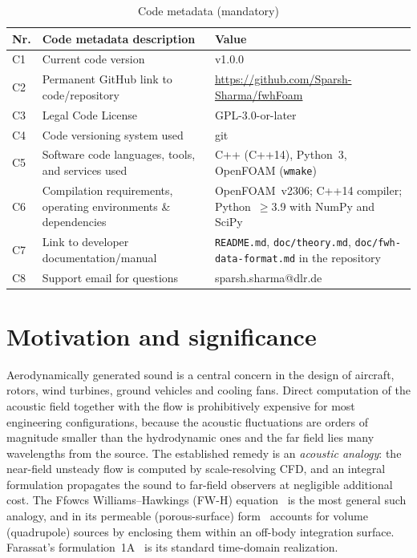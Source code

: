\documentclass[preprint,12pt,a4paper]{elsarticle}
\begin{document}
\begin{table}[!h]
\begin{tabular}{|l|p{5.4cm}|p{6.2cm}|}
\hline
\textbf{Nr.} & \textbf{Code metadata description} & \textbf{Value} \\
\hline
C1 & Current code version & v1.0.0 \\
\hline
C2 & Permanent GitHub link to code/repository & \url{https://github.com/Sparsh-Sharma/fwhFoam} \\
\hline
C3 & Legal Code License & GPL-3.0-or-later \\
\hline
C4 & Code versioning system used & git \\
\hline
C5 & Software code languages, tools, and services used & C++ (C++14), Python~3, OpenFOAM (\texttt{wmake}) \\
\hline
C6 & Compilation requirements, operating environments \& dependencies & OpenFOAM~v2306; C++14 compiler; Python~$\ge$3.9 with NumPy and SciPy \\
\hline
C7 & Link to developer documentation/manual & \texttt{README.md}, \texttt{doc/theory.md}, \texttt{doc/fwh-data-format.md} in the repository \\
\hline
C8 & Support email for questions & sparsh.sharma@dlr.de \\
\hline
\end{tabular}
\caption{Code metadata (mandatory)}
\end{table}

\section{Motivation and significance}
\label{sec:motivation}

Aerodynamically generated sound is a central concern in the design of
aircraft, rotors, wind turbines, ground vehicles and cooling fans. Direct
computation of the acoustic field together with the flow is prohibitively
expensive for most engineering configurations, because the acoustic
fluctuations are orders of magnitude smaller than the hydrodynamic ones and
the far field lies many wavelengths from the source. The established remedy
is an \emph{acoustic analogy}: the near-field unsteady flow is computed by
scale-resolving CFD, and an integral formulation propagates the sound to
far-field observers at negligible additional cost. The Ffowcs
Williams--Hawkings (FW-H) equation~\cite{fwh1969} is the most general such
analogy, and in its permeable (porous-surface) form~\cite{difrancescantonio1997,
brentner1998} accounts for volume (quadrupole) sources by enclosing them
within an off-body integration surface. Farassat's formulation~1A~\cite{farassat2007}
is its standard time-domain realization.
\end{document}
